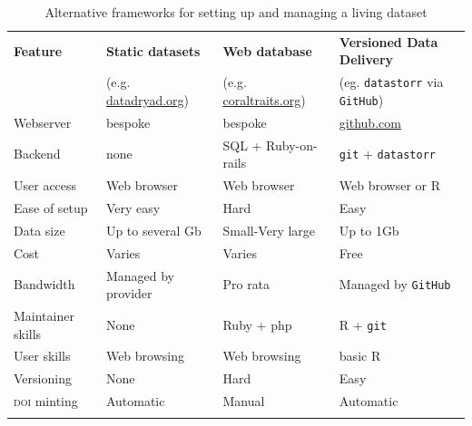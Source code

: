 \documentclass[a4paper,11pt]{article}
\newcommand{\smurl}[1]{{\footnotesize\href{https://#1}{#1}}}
\begin{document}
\begin{table}[h!]
\centering
\caption{Alternative frameworks for setting up and managing a living dataset}
{\footnotesize
\vspace{1cm}
  \begin{tabular}{p{2.5cm}p{3.5cm}p{3.5cm}p{4cm}}
  \hline
  \textbf{Feature} & \textbf{Static datasets}& \textbf{Web database} & \textbf{Versioned Data Delivery}\\
  \textbf{} & (e.g. \smurl{datadryad.org})& (e.g. \smurl{coraltraits.org}) & (eg. \texttt{datastorr} via \texttt{GitHub})\\
  \hline
   Webserver        & bespoke & bespoke &  \smurl{github.com}\\
   Backend          & none & SQL + Ruby-on-rails 			& \texttt{git} + \texttt{datastorr} \\
   User access      & Web browser & Web browser 				    & Web browser or R \\
   Ease of setup    & Very easy & Hard 							& Easy\\
   Data size        & Up to several Gb & Small-Very large 				& Up to 1Gb\\
   Cost             & Varies & Varies  						& Free \\
   Bandwidth        & Managed by provider & Pro rata 						& Managed by \texttt{GitHub}\\
   Maintainer skills & None & Ruby + php 					& R + \texttt{git} \\
   User skills      &Web browsing& Web browsing  					& basic R \\
   Versioning       &None& Hard 							& Easy \\
   \textsc{doi} minting      &Automatic & Manual 					& Automatic \\
  \hline 
  \\
 
  \end{tabular}
  } 
\label{tab:publishing_models}
\end{table}

\newpage
\end{document}
